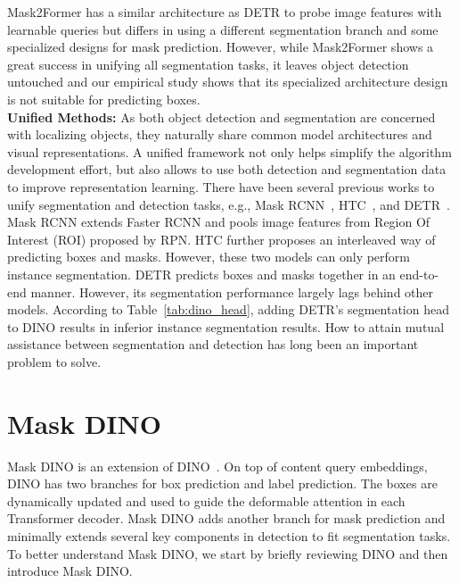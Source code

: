 \documentclass[10pt,twocolumn,letterpaper]{article}
\begin{document}
Mask2Former has a similar architecture as DETR to probe image features with learnable queries but differs in using a different segmentation branch and some specialized designs for mask prediction. However, while Mask2Former shows a great success in unifying all segmentation tasks, it leaves object detection untouched and our empirical study shows that its specialized architecture design is not suitable for predicting boxes.
\\\textbf{Unified Methods:}
As both object detection and segmentation are concerned with localizing objects, they naturally share common model architectures and visual representations. A unified framework not only helps simplify the algorithm development effort, but also allows to use both detection and segmentation data to improve representation learning. There have been several previous works to unify segmentation and detection tasks, e.g., Mask RCNN~\cite{he2017mask}, HTC~\cite{chen2019hybrid}, and DETR~\cite{carion2020end}. Mask RCNN extends Faster RCNN and pools image features from Region Of Interest (ROI) proposed by RPN.
HTC further proposes an interleaved way of predicting boxes and masks. 
However, these two models can only perform instance segmentation. DETR predicts boxes and masks together in an end-to-end manner. However, its segmentation performance largely lags behind other models. According to Table~\ref{tab:dino_head}, adding DETR's segmentation head to DINO results in inferior instance segmentation results.
How to attain mutual assistance between segmentation and detection 
has long been an important problem to solve.

\section{Mask DINO}
Mask DINO is an extension of DINO~\cite{zhang2022dino}. On top of content query embeddings, DINO has two branches for box prediction and label prediction. The boxes are dynamically updated and used to guide the deformable attention in each Transformer decoder. Mask DINO adds another branch for mask prediction and minimally extends several key components in detection to fit segmentation tasks. To better understand Mask DINO, we start by briefly reviewing DINO and then introduce Mask DINO.
\end{document}
